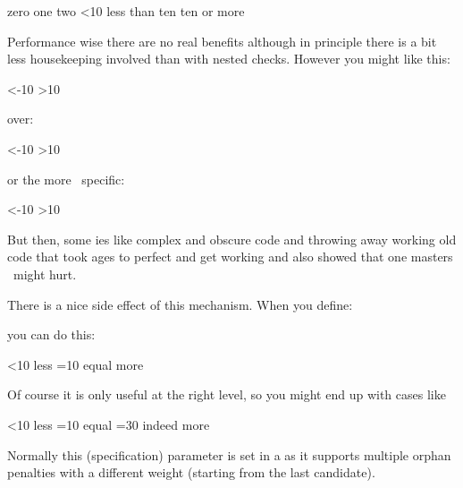 \starttyping
\ifcase\scratchcounter          zero
\or                             one
\or                             two
\orelse\ifnum\scratchcounter<10 less than ten
\else                           ten or more
\fi
\stoptyping

Performance wise there are no real benefits although in principle there is a bit
less housekeeping involved than with nested checks. However you might like this:

\starttyping
\ifnum\scratchcounter<-10
    \expandafter\toosmall
\orelse\ifnum\scratchcounter>10
    \expandafter\toolarge
\else
    \expandafter\justright
\fi
\stoptyping

over:

\starttyping
\ifnum\scratchcounter<-10
    \expandafter\toosmall
\else\ifnum\scratchcounter>10
    \expandafter\expandafter\expandafter\toolarge
\else
    \expandafter\expandafter\expandafter\justright
\fi\fi
\stoptyping

or the more \CONTEXT\ specific:

\starttyping
\ifnum\scratchcounter<-10
    \expandafter\toosmall
\else\ifnum\scratchcounter>10
    \doubleexpandafter\toolarge
\else
    \doubleexpandafter\justright
\fi\fi
\stoptyping

But then, some \TEX ies like complex and obscure code and throwing away working
old code that took ages to perfect and get working and also showed that one
masters \TEX\ might hurt.

There is a nice side effect of this mechanism. When you define:

\starttyping
\def\quitcondition{\orelse\iffalse}
\stoptyping

you can do this:

\starttyping
\ifnum{}<10
    less
\orelse\ifnum{}=10
    equal
    \quitcondition
    indeed
\else
    more
\fi
\stoptyping

Of course it is only useful at the right level, so you might end up with cases like

\starttyping
\ifnum{}<10
    less
\orelse\ifnum{}=10
    equal
    \ifnum{}=30
        \expandafter\quitcondition
    \fi
    indeed
\else
    more
\fi
\stoptyping

\stopnewprimitive

\startnewprimitive[title={\prm {orphanlinefactors}}]

Normally this (specification) parameter is set in a  as it
supports multiple orphan penalties with a different weight (starting from the
last candidate).

